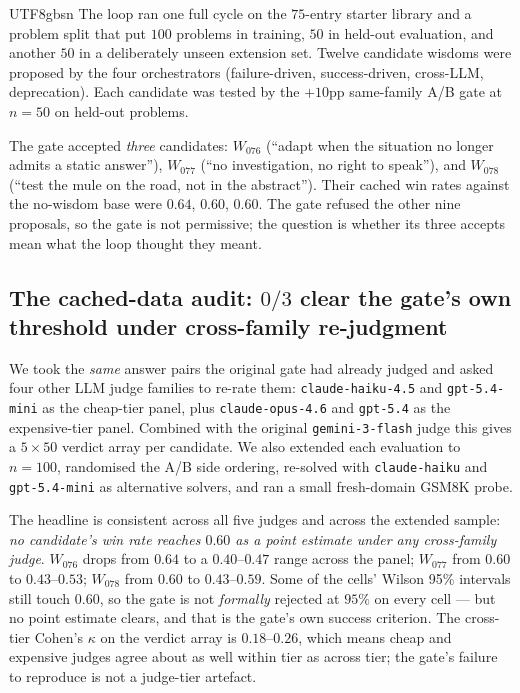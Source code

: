 \documentclass{article}
\begin{document}
\begin{CJK*}{UTF8}{gbsn}
The loop ran one full cycle on the \(75\)-entry starter library
and a problem split that put \(100\) problems in training,
\(50\) in held-out evaluation, and another \(50\) in a deliberately
unseen extension set. Twelve candidate wisdoms were proposed by
the four orchestrators (failure-driven, success-driven,
cross-LLM, deprecation). Each candidate was tested by the
\(+10\)pp same-family A/B gate at \(n=50\) on held-out problems.

The gate accepted \emph{three} candidates: \(W_{076}\) (``adapt
when the situation no longer admits a static answer''),
\(W_{077}\) (``no investigation, no right to speak''), and
\(W_{078}\) (``test the mule on the road, not in the abstract'').
Their cached win rates against the no-wisdom base were
\(0.64\), \(0.60\), \(0.60\). The gate refused the other nine
proposals, so the gate is not permissive; the question is whether
its three accepts mean what the loop thought they meant.

\subsection{The cached-data audit: \(0/3\) clear the gate's own
threshold under cross-family re-judgment}
\label{sec:exp-summary-cached}

We took the \emph{same} answer pairs the original gate had
already judged and asked four other LLM judge families to re-rate
them: \texttt{claude-haiku-4.5} and \texttt{gpt-5.4-mini} as the
cheap-tier panel, plus \texttt{claude-opus-4.6} and
\texttt{gpt-5.4} as the expensive-tier panel. Combined with the
original \texttt{gemini-3-flash} judge this gives a \(5 \times 50\)
verdict array per candidate. We also extended each evaluation to
\(n=100\), randomised the A/B side ordering, re-solved with
\texttt{claude-haiku} and \texttt{gpt-5.4-mini} as alternative
solvers, and ran a small fresh-domain GSM8K probe.

The headline is consistent across all five judges and across the
extended sample: \emph{no candidate's win rate reaches \(0.60\) as
a point estimate under any cross-family judge}. \(W_{076}\) drops
from \(0.64\) to a \(0.40\)--\(0.47\) range across the panel;
\(W_{077}\) from \(0.60\) to \(0.43\)--\(0.53\); \(W_{078}\) from
\(0.60\) to \(0.43\)--\(0.59\). Some of the cells' Wilson 95\%
intervals still touch \(0.60\), so the gate is not \emph{formally}
rejected at \(95\%\) on every cell --- but no point estimate
clears, and that is the gate's own success criterion. The
cross-tier Cohen's \(\kappa\) on the verdict array is
\(0.18\)--\(0.26\), which means cheap and expensive judges agree
about as well within tier as across tier; the gate's failure to
reproduce is not a judge-tier artefact.


\end{CJK*}
\end{document}
